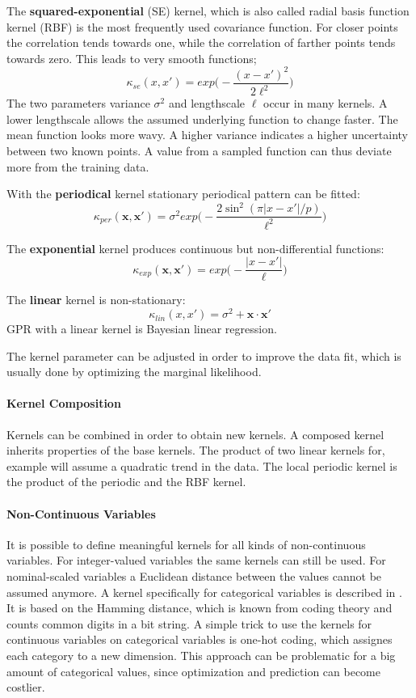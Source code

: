 \documentclass[english]{article}
\newcommand{\x}{\mathbf{x}}
\begin{document}

The \textbf{squared-exponential} (SE) kernel, which is also called radial basis function kernel (RBF) is the most frequently used covariance function. For closer points the correlation tends towards one, while the correlation of farther points tends towards zero. This leads to very smooth functions;
$$\kappa_{se}(x, x') = exp\bigg(-\frac{(x-x')^2}{2\ell^2}\bigg)$$
The two parameters variance $\sigma^2$ and lengthscale $\ell$ occur in many kernels. A lower lengthscale allows the assumed underlying function to change faster. The mean function looks more wavy. A higher variance indicates a higher uncertainty between two known points. A value from a sampled function can thus deviate more from the training data.

With the \textbf{periodical} kernel stationary periodical pattern can be fitted:
$$\kappa_{per}(\x,\x') = \sigma^2exp\bigg(-\frac{2 \sin^2(\pi|x-x'|/p)}{\ell^2}\bigg)$$

The \textbf{exponential} kernel produces continuous but non-differential functions:
$$\kappa_{exp}(\x,\x') = exp\bigg(-\frac{|x-x'|}{\ell}\bigg)$$

The \textbf{linear} kernel is non-stationary:
$$\kappa_{lin}(x, x') = \sigma^2 + \x\cdot\x'$$
GPR with a linear kernel is Bayesian linear regression.

The kernel parameter can be adjusted in order to improve the data fit, which is usually done by optimizing the marginal likelihood.

\paragraph{Kernel Composition}
Kernels can be combined in order to obtain new kernels. A composed kernel inherits properties of the base kernels. The product of two linear kernels for, example will assume a quadratic trend in the data. The local periodic kernel is the product of the periodic and the RBF kernel.

\paragraph{Non-Continuous Variables}
It is possible to define meaningful kernels for all kinds of non-continuous variables. For integer-valued variables the same kernels can still be used. For nominal-scaled variables a Euclidean distance between the values cannot be assumed anymore. A kernel specifically for categorical variables is described in \cite{hutter_sequential_2011}. It is based on the Hamming distance, which is known from coding theory and counts common digits in a bit string. A simple trick to use the kernels for continuous variables on categorical variables is one-hot coding, which assignes each category to a new dimension. This approach can be problematic for a big amount of categorical values, since optimization and prediction can become costlier.
\end{document}
